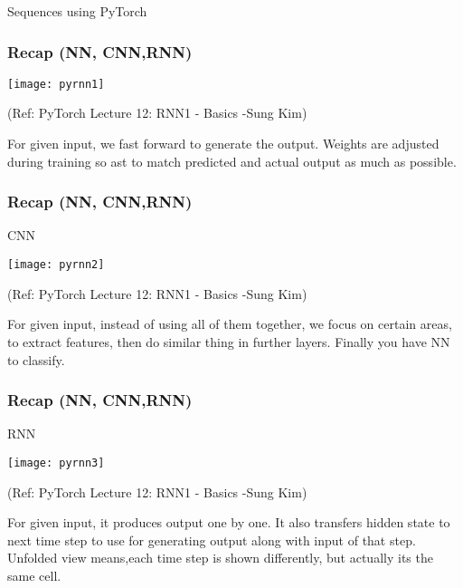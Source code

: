 
\begin{frame}
  \begin{center}
    {\Large Sequences using PyTorch}
    
  \end{center}
\end{frame}



\begin{frame}[fragile] \frametitle{Recap (NN, CNN,RNN)}
\begin{center}
\texttt{[image: pyrnn1]}

\tiny{(Ref: PyTorch Lecture 12: RNN1 - Basics -Sung Kim)}
\end{center}
For given input, we fast forward to generate the output. Weights are adjusted during training so ast to match predicted and actual output as much as possible.
\end{frame}

\begin{frame}[fragile] \frametitle{Recap (NN, CNN,RNN)}
CNN
\begin{center}
\texttt{[image: pyrnn2]}

\tiny{(Ref: PyTorch Lecture 12: RNN1 - Basics -Sung Kim)}
\end{center}
For given input, instead of using all of them together, we focus on certain areas, to extract features, then do similar thing in further layers. Finally you have NN to classify.
\end{frame}

\begin{frame}[fragile] \frametitle{Recap (NN, CNN,RNN)}
RNN
\begin{center}
\texttt{[image: pyrnn3]}

\tiny{(Ref: PyTorch Lecture 12: RNN1 - Basics -Sung Kim)}
\end{center}
For given input, it produces output one by one. It also transfers hidden state to next time step to use for generating output along with input of that step.
Unfolded view means,each time step is shown differently, but actually its the same cell.
\end{frame}



